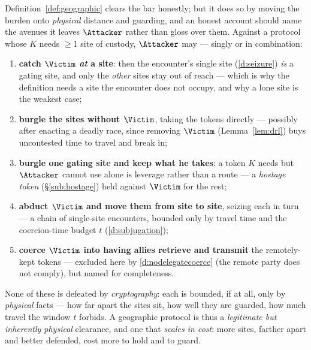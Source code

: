\begin{remark}\label{rem:geographic-cost}
Definition~\ref{def:geographic} clears the bar honestly; but it does so by moving
the burden onto \emph{physical} distance and guarding, and an honest account should
name the avenues it leaves $\Attacker$ rather than gloss over them. Against a
protocol whose $K$ needs $\ge 1$ site of custody, $\Attacker$ may --- singly or in
combination:
\begin{enumerate}[nosep,leftmargin=1.9em]
  \item \textbf{catch $\Victim$ \emph{at} a site}: then the encounter's single site
        (\ref{d:seizure}) \emph{is} a gating site, and only the \emph{other} sites
        stay out of reach --- which is why the definition needs a site the encounter
        does not occupy, and why a lone site is the weakest case;
  \item \textbf{burgle the sites without $\Victim$}, taking the tokens directly ---
        possibly after enacting a deadly race, since removing $\Victim$
        (Lemma~\ref{lem:drl}) buys uncontested time to travel and break in;
  \item \textbf{burgle one gating site and keep what he takes}: a token $K$ needs
        but $\Attacker$ cannot use alone is leverage rather than a route --- a
        \emph{hostage token} (\S\ref{sub:hostage}) held against $\Victim$ for the
        rest;
  \item \textbf{abduct $\Victim$ and move them from site to site}, seizing each in
        turn --- a chain of single-site encounters, bounded only by travel time and
        the coercion-time budget $t$ (\ref{d:subjugation});
  \item \textbf{coerce $\Victim$ into having allies retrieve and transmit} the
        remotely-kept tokens --- excluded here by \ref{d:nodelegatecoerce}
        (the remote party does not comply), but named for completeness.
\end{enumerate}
None of these is defeated by \emph{cryptography}: each is bounded, if at all, only
by \emph{physical} facts --- how far apart the sites sit, how well they are guarded,
how much travel the window $t$ forbids. A geographic protocol is thus a
\emph{legitimate but inherently physical} clearance, and one that \emph{scales in
cost}: more sites, farther apart and better defended, cost more to hold and to
guard.
\end{remark}

